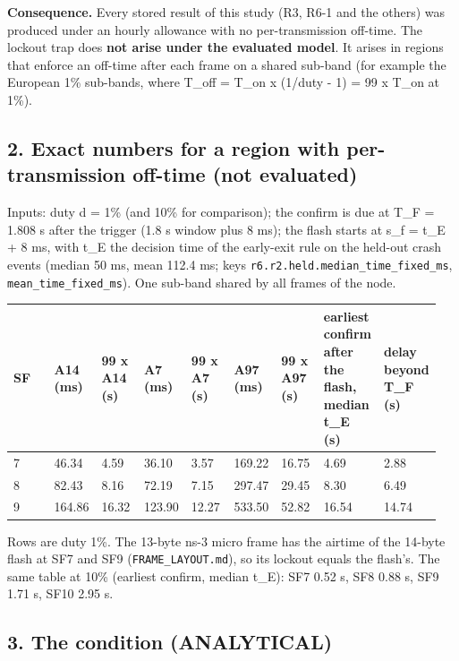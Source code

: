 \textbf{Consequence.} Every stored result of this study (R3, R6-1 and the others) was produced under an hourly allowance with no per-transmission off-time. The lockout trap does \textbf{not arise under the evaluated model}. It arises in regions that enforce an off-time after each frame on a shared sub-band (for example the European 1\% sub-bands, where T\_off = T\_on x (1/duty - 1) = 99 x T\_on at 1\%).

\subsection*{2. Exact numbers for a region with per-transmission off-time (not evaluated)}

Inputs: duty d = 1\% (and 10\% for comparison); the confirm is due at T\_F = 1.808 s after the trigger (1.8 s window plus 8 ms); the flash starts at s\_f = t\_E + 8 ms, with t\_E the decision time of the early-exit rule on the held-out crash events (median 50 ms, mean 112.4 ms; keys \texttt{r6.r2.held.median\_time\_fixed\_ms}, \texttt{mean\_time\_fixed\_ms}). One sub-band shared by all frames of the node.

{\scriptsize\raggedright
\begin{longtable}{p{0.106\linewidth}p{0.106\linewidth}p{0.106\linewidth}p{0.106\linewidth}p{0.106\linewidth}p{0.106\linewidth}p{0.106\linewidth}p{0.106\linewidth}p{0.106\linewidth}}
\toprule
SF & A14 (ms) & 99 x A14 (s) & A7 (ms) & 99 x A7 (s) & A97 (ms) & 99 x A97 (s) & earliest confirm after the flash, median t\_E (s) & delay beyond T\_F (s) \\
\midrule
\endhead
7 & 46.34 & 4.59 & 36.10 & 3.57 & 169.22 & 16.75 & 4.69 & 2.88 \\
8 & 82.43 & 8.16 & 72.19 & 7.15 & 297.47 & 29.45 & 8.30 & 6.49 \\
9 & 164.86 & 16.32 & 123.90 & 12.27 & 533.50 & 52.82 & 16.54 & 14.74 \\
\bottomrule
\end{longtable}}

Rows are duty 1\%. The 13-byte ns-3 micro frame has the airtime of the 14-byte flash at SF7 and SF9 (\texttt{FRAME\_LAYOUT.md}), so its lockout equals the flash's. The same table at 10\% (earliest confirm, median t\_E): SF7 0.52 s, SF8 0.88 s, SF9 1.71 s, SF10 2.95 s.

\subsection*{3. The condition (ANALYTICAL)}

